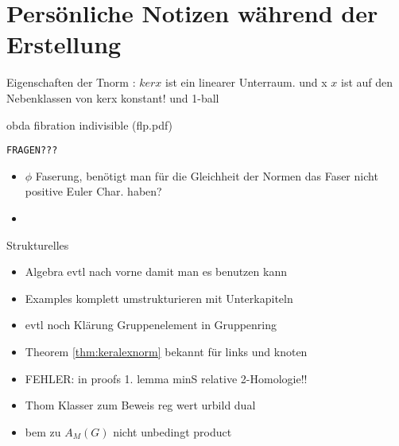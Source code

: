 
\section{Persönliche Notizen während der Erstellung}
	

	Eigenschaften der Tnorm : $kerx$ ist ein linearer Unterraum. und x $x$ ist auf den Nebenklassen von kerx konstant! und 1-ball


	obda fibration indivisible (flp.pdf)

\texttt{FRAGEN???}
	\begin{itemize}
		\item $\phi$ Faserung, benötigt man für die Gleichheit der Normen das Faser nicht positive Euler Char. haben?
		\item 
	\end{itemize}

	{Strukturelles}
	\begin{itemize}
		\item Algebra evtl nach vorne damit man es benutzen kann
		\item Examples komplett umstrukturieren mit Unterkapiteln
		\item evtl noch Klärung Gruppenelement in Gruppenring
		\item Theorem \ref{thm:keralexnorm} bekannt für links und knoten
		\item FEHLER: in proofs 1. lemma minS relative 2-Homologie!!
		\item Thom Klasser zum Beweis reg wert urbild dual
		\item bem zu $A_M(G)$ nicht unbedingt product
	\end{itemize}
